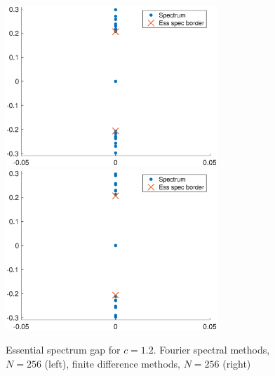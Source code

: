 \documentclass[12pt]{article}
\begin{document}
\begin{figure}[H]
\centering
\includegraphics[width=8cm]{essspecboundsF256.eps}
\includegraphics[width=8cm]{essspecboundsFD256.eps}
\caption{Essential spectrum gap for $c = 1.2$. Fourier spectral methods, $N = 256$ (left), finite difference methods, $N = 256$ (right)}
\end{figure}





\end{document}
